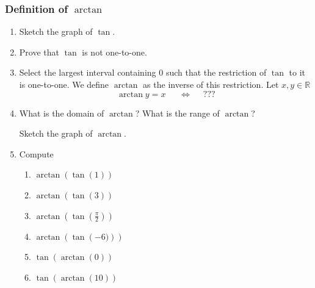 \documentclass[14pt]{beamer}
\newcommand {\DS} [1] {${\displaystyle #1}$}
\newcommand {\R}{\mathbb{R}}
\newcommand{\setsize}[1]{\fontsize{#1}{#1}\selectfont} %
\newcommand{\smallerfont}{\setsize{13}} %
\begin{document}
\begin{frame}[t]
\smallerfont
\frametitle{Definition of $\arctan$}

\begin{enumerate}
	\item  Sketch the graph of $\tan$.
	\item  Prove that $\tan$ is not one-to-one.
	\item  Select the largest interval containing $0$ such that the restriction of $\tan$ to it is one-to-one.
		We define $\arctan$ as the inverse of this restriction.  \quad Let $x, y \in \R$
		$$\arctan y = x \; \quad \; \iff \; \quad ???$$
	\item	What is the domain of \DS{\arctan}? 
		What is the range of \DS{\arctan}?
	
	 Sketch the graph of $\arctan$.
	\item Compute
		\begin{multicols}{2}
			\begin{enumerate}
				\item  \DS{\arctan \left( \tan \left( 1 \right) \right) }
				\item  \DS{\arctan \left( \tan \left( 3\right) \right) }
				\item \DS{\arctan \left( \tan \left( \frac{\pi}{2}\right) \right) }
				\item  \DS{\arctan \left( \tan \left( -6)\right) \right) }
				\item \DS{\tan \left( \arctan \left( 0\right) \right) }
				\item \DS{\tan \left( \arctan \left( 10\right) \right) }
			\end{enumerate}		
		\end{multicols}
\end{enumerate}



\end{frame}
\end{document}
